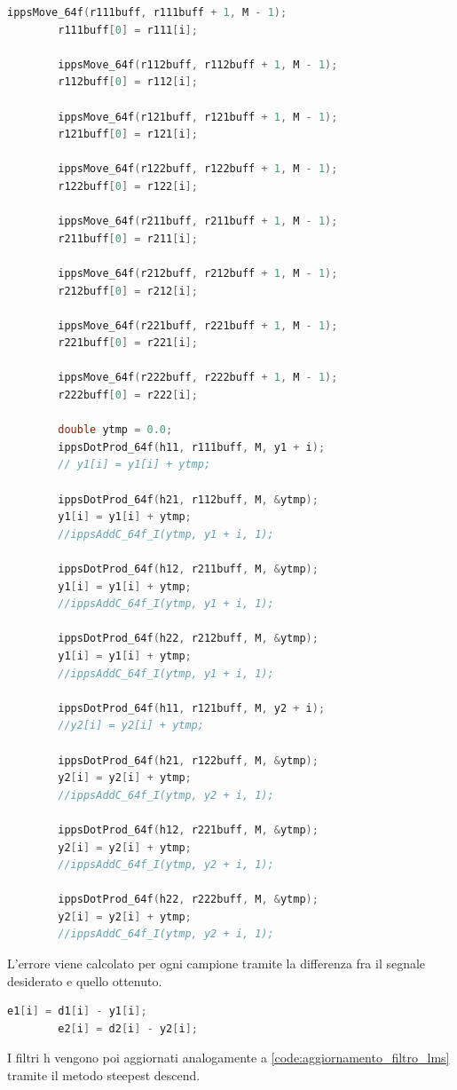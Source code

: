 \documentclass[12pt,a4paper,titlepage]{article}
\begin{document}
\begin{lstlisting}[language=cpp, label=code:uscite, caption = Calcolo delle uscite, breaklines = false, captionpos = b]
		ippsMove_64f(r111buff, r111buff + 1, M - 1);
		r111buff[0] = r111[i];

		ippsMove_64f(r112buff, r112buff + 1, M - 1);
		r112buff[0] = r112[i];

		ippsMove_64f(r121buff, r121buff + 1, M - 1);
		r121buff[0] = r121[i];

		ippsMove_64f(r122buff, r122buff + 1, M - 1);
		r122buff[0] = r122[i];

		ippsMove_64f(r211buff, r211buff + 1, M - 1);
		r211buff[0] = r211[i];

		ippsMove_64f(r212buff, r212buff + 1, M - 1);
		r212buff[0] = r212[i];

		ippsMove_64f(r221buff, r221buff + 1, M - 1);
		r221buff[0] = r221[i];

		ippsMove_64f(r222buff, r222buff + 1, M - 1);
		r222buff[0] = r222[i];

		double ytmp = 0.0;
		ippsDotProd_64f(h11, r111buff, M, y1 + i);
		// y1[i] = y1[i] + ytmp;

		ippsDotProd_64f(h21, r112buff, M, &ytmp);
		y1[i] = y1[i] + ytmp;
		//ippsAddC_64f_I(ytmp, y1 + i, 1);

		ippsDotProd_64f(h12, r211buff, M, &ytmp);
		y1[i] = y1[i] + ytmp;
		//ippsAddC_64f_I(ytmp, y1 + i, 1);

		ippsDotProd_64f(h22, r212buff, M, &ytmp);
		y1[i] = y1[i] + ytmp;
		//ippsAddC_64f_I(ytmp, y1 + i, 1);

		ippsDotProd_64f(h11, r121buff, M, y2 + i);
		//y2[i] = y2[i] + ytmp;

		ippsDotProd_64f(h21, r122buff, M, &ytmp);
		y2[i] = y2[i] + ytmp;
		//ippsAddC_64f_I(ytmp, y2 + i, 1);

		ippsDotProd_64f(h12, r221buff, M, &ytmp);
		y2[i] = y2[i] + ytmp;
		//ippsAddC_64f_I(ytmp, y2 + i, 1);

		ippsDotProd_64f(h22, r222buff, M, &ytmp);
		y2[i] = y2[i] + ytmp;
		//ippsAddC_64f_I(ytmp, y2 + i, 1);
\end{lstlisting}
L'errore viene calcolato per ogni campione tramite la differenza fra il segnale desiderato e quello ottenuto.
\begin{lstlisting}[language=cpp]
		e1[i] = d1[i] - y1[i];
		e2[i] = d2[i] - y2[i];
\end{lstlisting}
I filtri h vengono poi aggiornati analogamente a \ref{code:aggiornamento_filtro_lms} tramite il metodo steepest descend.
\end{document}
